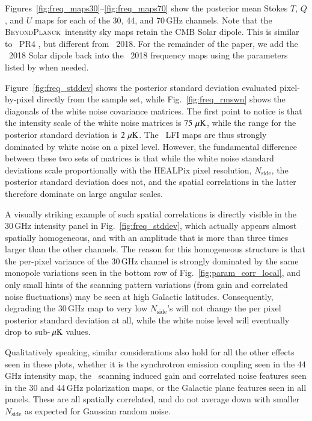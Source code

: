 \documentclass[twocolumn]{aa}
\newcommand{\BP}{\textsc{BeyondPlanck}}
\begin{document}
Figures~\ref{fig:freq_maps30}--\ref{fig:freq_maps70} show the
posterior mean Stokes $T$, $Q$, and $U$ maps for each of the 30, 44,
and 70\,GHz channels. Note that the \BP\ intensity sky maps retain the
CMB Solar dipole. This is similar to \Planck\ PR4 \citep{npipe}, but
different from \Planck\ 2018. For the remainder of the paper, we add
the \Planck\ 2018 Solar dipole back into the \Planck\ 2018 frequency
maps using the parameters listed by \citet{planck2016-l01} when needed.

Figure~\ref{fig:freq_stddev} shows the posterior standard deviation
evaluated pixel-by-pixel directly from the sample set, while
Fig.~\ref{fig:freq_rmswn} shows the diagonals of the white noise
covariance matrices. The first point to notice is that the intensity
scale of the white noise matrices is $75\,\muK$, while the range for
the posterior standard deviation is $2\,\muK$. The \Planck\ LFI maps
are thus strongly dominated by white noise on a pixel level. However,
the fundamental difference between these two sets of matrices is that
while the white noise standard deviations scale proportionally with
the HEALPix pixel resolution, $N_{\mathrm{side}}$, the posterior
standard deviation does not, and the spatial correlations in the
latter therefore dominate on large angular scales.

A visually striking example of such spatial correlations is directly
visible in the 30\,GHz intensity panel in Fig.~\ref{fig:freq_stddev},
which actually appears almost spatially homogeneous, and with an
amplitude that is more than three times larger than the other
channels. The reason for this homogeneous structure is that the
per-pixel variance of the 30\,GHz channel is strongly dominated by the
same monopole variations seen in the bottom row of
Fig.~\ref{fig:param_corr_local}, and only small hints of the scanning
pattern variations (from gain and correlated noise fluctuations) may
be seen at high Galactic latitudes. Consequently, degrading the
30\,GHz map to very low $N_{\mathrm{side}}$'s will not change the per
pixel posterior standard deviation at all, while the white noise level
will eventually drop to sub-$\muK$ values.

Qualitatively speaking, similar considerations also hold for all the
other effects seen in these plots, whether it is the synchrotron
emission coupling seen in the 44\,GHz intensity map, the
\Planck\ scanning induced gain and correlated noise features seen in
the 30 and 44\,GHz polarization maps, or the Galactic plane features
seen in all panels. These are all spatially correlated, and do not
average down with smaller $N_{\mathrm{side}}$ as expected for Gaussian
random noise.
\end{document}
